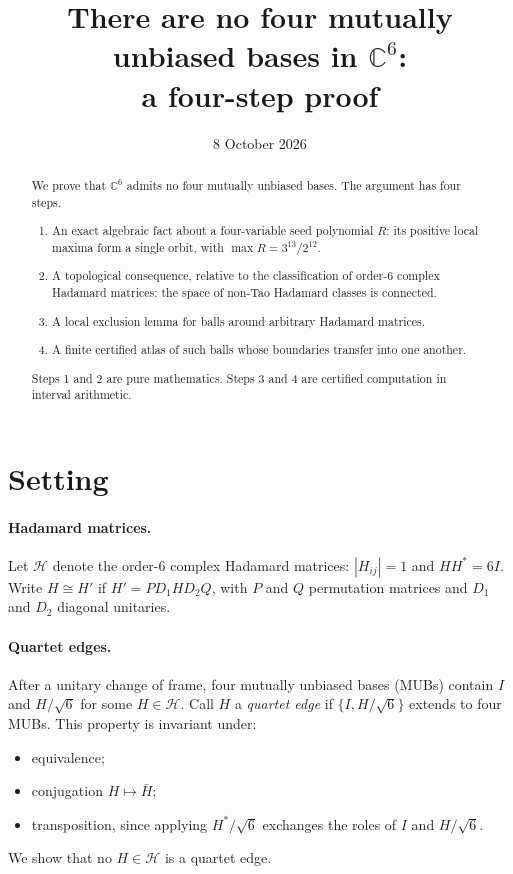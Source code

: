 \documentclass[11pt]{article}
\title{There are no four mutually unbiased bases in $\mathbb C^6$:\\ a four-step proof}
\author{}
\date{8 October 2026}
\theoremstyle{remark}
\newcommand{\Had}{\mathcal H}
\begin{document}
\maketitle

\begin{abstract}
We prove that $\mathbb C^6$ admits no four mutually unbiased bases. The argument has four steps.
\begin{enumerate}
\item An exact algebraic fact about a four-variable seed polynomial $R$: its positive local maxima form a single orbit, with $\max R=3^{13}/2^{12}$.
\item A topological consequence, relative to the classification of order-6 complex Hadamard matrices: the space of non-Tao Hadamard classes is connected.
\item A local exclusion lemma for balls around arbitrary Hadamard matrices.
\item A finite certified atlas of such balls whose boundaries transfer into one another.
\end{enumerate}
Steps 1 and 2 are pure mathematics. Steps 3 and 4 are certified computation in interval arithmetic.
\end{abstract}

\section{Setting}

\paragraph{Hadamard matrices.} Let $\Had$ denote the order-6 complex Hadamard matrices: $|H_{ij}|=1$ and $HH^*=6I$. Write $H\cong H'$ if $H'=PD_1HD_2Q$, with $P$ and $Q$ permutation matrices and $D_1$ and $D_2$ diagonal unitaries.

\paragraph{Quartet edges.} After a unitary change of frame, four mutually unbiased bases (MUBs) contain $I$ and $H/\sqrt6$ for some $H\in\Had$. Call $H$ a \emph{quartet edge} if $\{I,H/\sqrt6\}$ extends to four MUBs. This property is invariant under:
\begin{itemize}
\item equivalence;
\item conjugation $H\mapsto\bar H$;
\item transposition, since applying $H^*/\sqrt6$ exchanges the roles of $I$ and $H/\sqrt6$.
\end{itemize}
We show that no $H\in\Had$ is a quartet edge.
\end{document}
